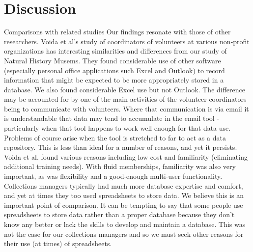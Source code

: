 \section{Discussion}
Comparisons with related studies
Our findings resonate with those of other researchers.
Voida et al's study of coordinators of volunteers at various non-profit organizations has interesting similarities and differences from our study of Natural History Musems. They found considerable use of other software (especially personal office applications such Excel and Outlook) to record information that might be expected to be more appropriately stored in a database. We also found considerable Excel use but not Outlook. The difference may be accounted for by one of the main activities of the volunteer coordinators being to communicate with volunteers. Where that communication is via email it is understandable that data may tend to accumulate in the email tool - particularly when that tool happens to work well enough for that data use. Problems of course arise when the tool is stretched to far to act as a data repository. This is less than ideal for a number of reasons, and yet it persists. Voida et al. found various reasons including low cost and familiarity (eliminating additional training needs). With fluid memberships, familiarity was also very important, as was flexibility and a good-enough multi-user functionality. Collections managers typically had much more database expertise and comfort, and yet at times they too used spreadsheets to store data. We believe this is an important point of comparison. It can be tempting to say that some people use spreadsheets to store data rather than a proper database because they don't know any better or lack the skills to develop and maintain a database. This was not the case for our collections managers and so we must seek other reasons for their use (at times) of spreadsheets.

